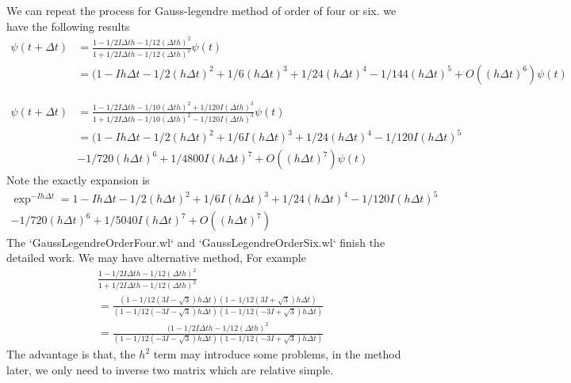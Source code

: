 \documentclass[12pt,twoside]{article}
\begin{document}
We can repeat the process for Gauss-legendre method of order of four or six. we have the following results
\begin{align*}
\psi(t + \Delta t) &= \frac{1 - 1/2 I \Delta t h - 1/12 (\Delta t h)^2}{ 1 + 1/2 I \Delta t h - 1/12 (\Delta t h)^2} \psi(t)\\
&=(1 - I h \Delta t - 1/2 (h \Delta t)^2 + 1/6 (h \Delta t)^3 + 1/24(h \Delta t)^4 - 1/144(h \Delta t)^5 + O((h \Delta t)^6)\psi(t)
\end{align*}

\begin{align*}
\psi(t + \Delta t) &= \frac{1 - 1/2 I \Delta t h - 1/10 (\Delta t h)^2 + 1/120 I (\Delta t h)^3}{ 1 + 1/2 I \Delta t h - 1/10 (\Delta t h)^2 - 1/120 I (\Delta t h)^3} \psi(t)\\
&=(1 - I h \Delta t - 1/2 (h \Delta t)^2 + 1/6 I(h \Delta t)^3 + 1/24(h \Delta t)^4 - 1/120I(h \Delta t)^5\\
&-1/720(h \Delta t)^6 + 1/4800I(h \Delta t)^7+ O((h \Delta t)^7)\psi(t)
\end{align*}
Note the exactly expansion is
\begin{multline}
\exp^{-Ih\Delta t} = 1 - I h \Delta t - 1/2 (h \Delta t)^2 + 1/6 I(h \Delta t)^3 + 1/24(h \Delta t)^4 - 1/120I(h \Delta t)^5\\
-1/720(h \Delta t)^6 + 1/5040I(h \Delta t)^7+ O((h \Delta t)^7)
\end{multline}
The `GaussLegendreOrderFour.wl` and  `GaussLegendreOrderSix.wl` finish the detailed work.
We may have alternative method, For example
\begin{align*}
&\frac{1 - 1/2 I \Delta t h - 1/12 (\Delta t h)^2}{ 1 + 1/2 I \Delta t h - 1/12 (\Delta t h)^2}\\
&=\frac{(1-1/12(3I-\sqrt{3})h \Delta t)(1-1/12(3I+\sqrt{3})h \Delta t)}{(1-1/12(-3I-\sqrt{3})h \Delta t)(1-1/12(-3I+\sqrt{3})h \Delta t)}\\
&=\frac{(1 - 1/2 I \Delta t h - 1/12 (\Delta t h)^2}{(1-1/12(-3I-\sqrt{3})h \Delta t)(1-1/12(-3I+\sqrt{3})h \Delta t)}
\end{align*}
The advantage is that, the $h^2$ term may introduce some problems, in the method later, we only need to inverse two matrix which are relative simple.
\end{document}
